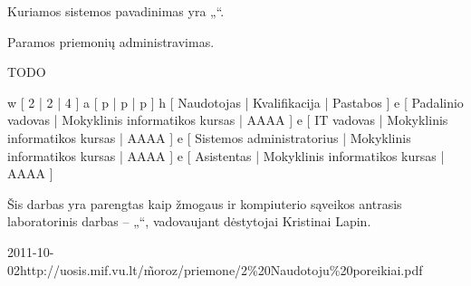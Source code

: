 Kuriamos sistemos pavadinimas yra „\systemname“.

Paramos priemonių administravimas.

TODO

\xtable
{
  w [ 2 | 2 | 4 ]
  a [ p | p | p ]
  h [ Naudotojas | Kvalifikacija | Pastabos ]
  e [ Padalinio vadovas | Mokyklinis informatikos kursas
  | AAAA
  ]
  e [ IT vadovas | Mokyklinis informatikos kursas
  | AAAA
  ]
  e [ Sistemos administratorius | Mokyklinis informatikos kursas
  | AAAA
  ]
  e [ Asistentas | Mokyklinis informatikos kursas
  | AAAA
  ]
}

Šis darbas yra parengtas kaip žmogaus ir kompiuterio sąveikos antrasis laboratorinis darbas
– „\docname“, vadovaujant dėstytojai Kristinai Lapin.

\xdoclist
{
  {2011-10-02}{http://uosis.mif.vu.lt/\~moroz/priemone/2\%20Naudotoju\%20poreikiai.pdf}
}
